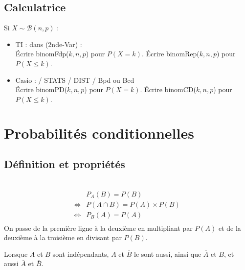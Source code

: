 \documentclass[a4paper,11pt]{article} \usepackage{FBarticle} \mapage{831}{Probabilités 1} %
\begin{document}
\begin{multicols}{2}
\subsection{Calculatrice}
Si $X\sim\mathcal{B}(n,p)$ :
\begin{itemize}
\item TI : dans (2nde-Var) : \\
Écrire binomFdp($k,n,p$) pour $P(X=k)$.
Écrire binomRep($k,n,p$) pour $P(X\leq k)$.
\item Casio :  / STATS / DIST / Bpd ou Bcd \\
Écrire binomPD($k,n,p$) pour $P(X=k)$.
Écrire binomCD($k,n,p$) pour $P(X\leq k)$.
\end{itemize}

\vfill\null\columnbreak

\section{Probabilités conditionnelles}
\subsection{Définition et propriétés}
\par
{}\\
\prop\begin{eqnarray*}
                     & P_A(B)=P(B) \\
\Leftrightarrow      & P(A\cap B)=P(A)\times P(B) \\
\Leftrightarrow      & P_B(A)=P(A) \\
\end{eqnarray*}
\demo On passe de la première ligne à la deuxième en multipliant par $P(A)$ et de la deuxième à la troisième en divisant par $P(B)$.\par

\rema Lorsque $A$ et $B$ sont indépendants, $A$ et $\overline{B}$ le sont aussi, ainsi que $\overline{A}$ et $B$, et aussi $\overline{A}$ et $\overline{B}$.\par

\par


\end{multicols}
\end{document}
